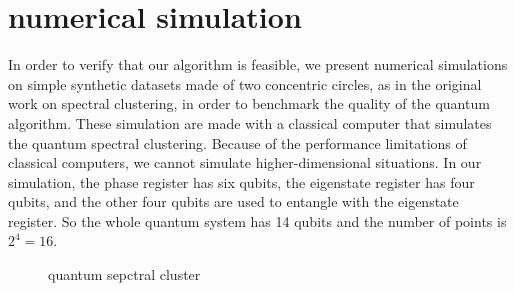 \documentclass[twocolumn,notitlepage]{revtex4-1}
\begin{document}
\section{numerical simulation}
In order to verify that our algorithm is feasible, we present numerical simulations on simple synthetic datasets made of two concentric circles, as in the original work on spectral clustering, in order to benchmark the quality of the quantum algorithm. 
These simulation are made with a classical computer that simulates the quantum spectral clustering. Because of the performance limitations of classical computers, we cannot simulate higher-dimensional situations. In our simulation, the phase register has six qubits, the eigenstate register has four qubits, and the other four qubits are used to entangle with the eigenstate register. So the whole quantum system has 14 qubits and the number of points is $2^4=16$.
\begin{figure}[H]
    \centering 
    \caption{quantum sepctral cluster}
    \label{Fig.main}
\end{figure}
\end{document}
